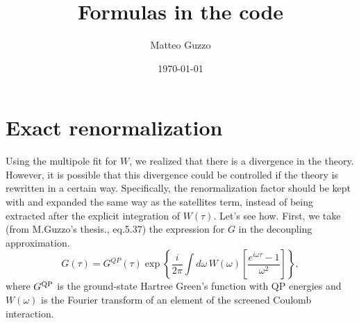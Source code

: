\documentclass[a4paper,12pt]{article}
\title{Formulas in the code}
\author{Matteo Guzzo}
\date{\today}
\def\be{\begin{equation}}
\def\ee{\end{equation}}
\begin{document}
\maketitle

\tableofcontents


\section{Exact renormalization}

Using the multipole fit for $W$, we realized that there is a divergence in the theory. 
However, it is possible that this divergence could be controlled if the theory is rewritten
in a certain way. 
Specifically, the renormalization factor should be kept with and expanded the same way as 
the satellites term, instead of being extracted after the explicit integration of $W(\tau)$. 
Let's see how. 
First, we take (from M.\@ Guzzo's thesis., eq.\@ 5.37) the expression for $G$ in the decoupling approximation. 
\be\label{eq:onelevelg_qp}
   {G} ( \tau ) =  {G}^{QP} ( \tau ) 
  \exp\left\{ \frac{i}{2\pi} \int\! d\omega\,
   {W} ( \omega )\left[ 
   \frac{ e^{i\omega \tau } - 1} 
     {\omega^2} \right]  \right\} ,
\ee
where $G^\textnormal{QP}$ is the ground-state Hartree Green's function
with QP energies and $W(\omega)$ is the Fourier transform of an element of
the screened Coulomb interaction. 
\end{document}
